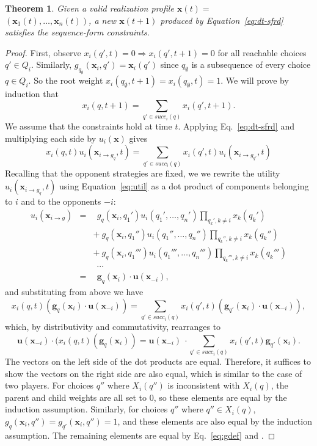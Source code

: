 \documentclass{aamas2014}
\newcommand{\bx}{\mathbf{x}}
\newcommand{\bg}{\mathbf{g}}
\newcommand{\bu}{\mathbf{u}}
\newtheorem{theorem}{Theorem}
\begin{document}
\begin{theorem}
Given a valid realization profile $\bx(t) = $\\ $(\bx_1(t), \ldots, \bx_n(t))$, a new $\bx(t+1)$ produced by
Equation~\ref{eq:dt-sfrd} satisfies the sequence-form constraints. 
\end{theorem}
\begin{proof}
First, observe $x_i(q',t) = 0 \Rightarrow x_i(q',t+1) = 0$ for all reachable choices $q' \in Q_i$. 
Similarly,  $g_{q_{\emptyset}}(\bx_i, q') = \bx_i(q')$ since $q_{\emptyset}$ is a subsequence of every choice 
$q \in Q_i$. So the root weight $x_i(q_{\emptyset}, t+1) = x_i(q_{\emptyset},t) = 1$.   
We will prove by induction that 
\[ x_i(q,t+1) = \sum_{q' \in succ_i(q)} x_i(q',t+1). \]
We assume that the constraints hold at time $t$. 
Applying Eq.~\ref{eq:dt-sfrd} and multiplying each side by $u_i(\bx)$ gives
\[
x_i(q,t) u_i(\bx_{i \rightarrow g_q}, t) = \sum_{q' \in succ_i(q)} x_i(q',t) u_i(\bx_{i \rightarrow g_{q'}},t) 
\]
Recalling that the opponent strategies are fixed, we 
we rewrite the utility $u_i(\bx_{i \rightarrow g_q}, t)$ using Equation~\ref{eq:util} as a dot product of 
components belonging to $i$ and to the opponents $-i$: 
\begin{eqnarray*}
u_i(\bx_{i \rightarrow g}) & = & ~~g_q(\bx_i, q_1') u_i(q_1', \ldots, q_n') \prod_{q_k', k \not= i} x_k(q_k') \\
                           &   & +~g_q(\bx_i, q_1'') u_i(q_1'', \ldots, q_n'') \prod_{q_k'', k \not= i} x_k(q_k'') \\
                           &   & +~g_q(\bx_i, q_1''') u_i(q_1''', \ldots, q_n''') \prod_{q_k''', k \not= i} x_k(q_k''') \\
                           &   & ~~\cdots \\
                           & = & ~~\bg_q(\bx_i) \cdot \bu(\bx_{-i}),
\end{eqnarray*}
and substituting from above we have 
\[x_i(q,t)(\bg_q(\bx_i) \cdot \bu(\bx_{-i})) = \sum_{q' \in succ_i(q)} x_i(q',t) (\bg_{q'}(\bx_i) \cdot \bu(\bx_{-i})), \]
which, by distributivity and commutativity, rearranges to
\[ \bu(\bx_{-i}) \cdot (x_i(q,t)(\bg_q(\bx_i)) = \bu(\bx_{-i})~\cdot\sum_{q' \in succ_i(q)} x_i(q',t) \bg_{q'}(\bx_i). \]
The vectors on the left side of the dot products are equal.
Therefore, it suffices to show the vectors on the right side are also equal, which is similar to the case of two players.   
For choices $q''$ where $X_i(q'')$ is inconsistent with $X_i(q)$, the parent and child weights are all set to $0$, so these 
elements are equal by the induction assumption. 
Similarly, for choices $q''$ where $q'' \in X_i(q)$, $g_q(\bx_i, q'') = g_{q'}(\bx_i, q'') = 1$, and these elements are also 
equal by the induction assumption. 
The remaining elements are equal by Eq.~\ref{eq:gdef} and \cite[Lemma 6]{Gatti13Efficient}. 
\end{proof}
\end{document}
